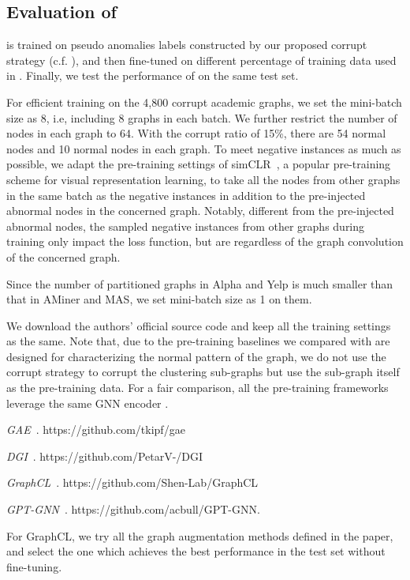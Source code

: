 \subsection{Evaluation of \pmodel}
\spmodel is trained on pseudo anomalies labels constructed by our proposed corrupt strategy (c.f. ), and then fine-tuned on different percentage of training data used in \model. Finally, we test the performance of \spmodel on the same test set. 

For efficient training on the 4,800 corrupt academic graphs, we set the mini-batch size as 8, i.e, including 8 graphs in each batch. We further restrict the number of nodes in each graph to 64. With the corrupt ratio of 15\%, there are 54 normal nodes and  10 normal nodes in each graph. To meet negative instances as much as possible, we adapt the pre-training settings of simCLR~\cite{chen2020simple}, a popular pre-training scheme for visual representation learning, to take all the nodes from other graphs in the same batch as the negative instances in addition to the pre-injected abnormal nodes in the concerned graph. 
Notably, different from the pre-injected abnormal nodes, the sampled negative instances from other graphs during training only impact the loss function, but are regardless of the graph convolution of the concerned graph. 

Since the number of partitioned graphs in Alpha and Yelp is much smaller than that in AMiner and MAS, we set mini-batch size as 1 on them.


We download the authors' official source code and keep all the training settings as the same. Note that, due to the pre-training baselines we compared with are designed for characterizing the normal pattern of the graph, we do not use the corrupt strategy to corrupt the clustering sub-graphs but use the sub-graph itself as the pre-training data. For a fair comparison, all the pre-training frameworks leverage the same GNN encoder \smodel.

	
\textit{GAE}~\cite{kipf2016variational}. https://github.com/tkipf/gae

\textit{DGI}~\cite{velickovic2019deep}. https://github.com/PetarV-/DGI

\textit{GraphCL}~\cite{you2020graph}. https://github.com/Shen-Lab/GraphCL

\textit{GPT-GNN}~\cite{hu2020gpt}. https://github.com/acbull/GPT-GNN.

For GraphCL, we try all the graph augmentation methods defined in the paper, and select the one which achieves the best performance in the test set without fine-tuning. 
